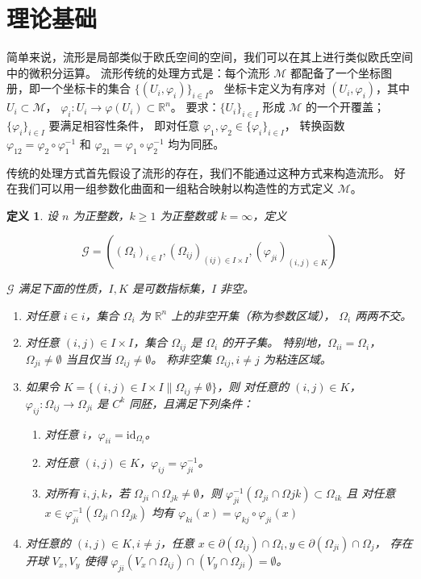 \documentclass{ctexart}
\newtheorem{Def}{定义}
\begin{document}
\section{理论基础}
	简单来说，流形是局部类似于欧氏空间的空间，我们可以在其上进行类似欧氏空间中的微积分运算。
	流形传统的处理方式是：每个流形 $\mathcal{M}$ 都配备了一个坐标图册，即一个坐标卡的集合 $\{(U_i,\varphi_i)\}_{i\in I}$。
	坐标卡定义为有序对 $(U_i,\varphi_i)$，其中
	$U_i\subset \mathcal{M}$，
	$\varphi_i:U_i\rightarrow \varphi(U_i)\subset \mathbb{R}^n$。
	要求：$\{U_i\}_{i\in I}$ 形成 $\mathcal{M}$ 的一个开覆盖；
	$\{\varphi_i\}_{i\in I}$ 要满足相容性条件，
	即对任意 $\varphi_1,\varphi_2\in \{\varphi_i\}_{i\in I}$，
	转换函数 $\varphi_{12}=\varphi_2\circ \varphi_1^{-1}$ 和 $\varphi_{21}=\varphi_1\circ \varphi_2^{-1}$ 均为同胚。

	传统的处理方式首先假设了流形的存在，我们不能通过这种方式来构造流形。
	好在我们可以用一组参数化曲面和一组粘合映射以构造性的方式定义 $\mathcal{M}$。

	\begin{Def}\label{PGM-def}
		设 $n$ 为正整数，$k\geq 1$ 为正整数或 $k=\infty$，定义

		\begin{equation}
			\mathcal{G}=((\Omega_i)_{i\in I},(\Omega_{ij})_{(ij)\in I\times I},(\varphi_{ji})_{(i,j)\in K})
		\end{equation}

		$\mathcal{G}$ 满足下面的性质，$I,K$ 是可数指标集，$I$ 非空。

		\begin{enumerate}
			\item
				对任意 $i\in i$，集合 $\Omega_i$ 为 $\mathbb{R}^n$ 上的非空开集（称为参数区域），
				$\Omega_i$ 两两不交。
			\item
				对任意 $(i,j)\in I\times I$，集合 $\Omega_{ij}$ 是 $\Omega_i$ 的开子集。
				特别地，$\Omega_{ii}=\Omega_i$，$\Omega_{ji}\neq \emptyset$ 当且仅当 $\Omega_{ij}\neq \emptyset$。
				称非空集 $\Omega_{ij},i\neq j$ 为粘连区域。
			\item
				如果令 $K=\{(i,j)\in I\times I\|\Omega_{ij}\neq \emptyset\}$，则
				对任意的 $(i,j)\in K$，$\varphi_{ij}:\Omega_{ij}\rightarrow \Omega_{ji}$ 是 $C^k$ 同胚，且满足下列条件：
				\begin{enumerate}
					\item 对任意 $i$，$\varphi_{ii}=\text{id}_{\Omega_i}$。
					\item 对任意 $(i,j)\in K$，$\varphi_{ij}=\varphi_{ji}^{-1}$。
					\item
						对所有 $i,j,k$，若 $\Omega_{ji}\cap \Omega_{jk}\neq \emptyset$，则
						$\varphi_{ji}^{-1}(\Omega_{ji}\cap \Omega{jk})\subset \Omega_{ik}$ 且
						对任意 $x\in \varphi_{ji}^{-1}(\Omega_{ji}\cap \Omega_{jk})$
						均有 $\varphi_{ki}(x)=\varphi_{kj}\circ\varphi_{ji}(x)$ 
				\end{enumerate}
			\item
				对任意的 $(i,j)\in K,i\neq j$，任意 $x\in \partial(\Omega_{ij})\cap \Omega_i,y\in \partial(\Omega_{ji})\cap \Omega_j$，
				存在开球 $V_x,V_y$ 使得 $\varphi_{ji}(V_x\cap \Omega_{ij})\cap (V_y\cap \Omega_{ji})=\emptyset$。
		\end{enumerate}
	\end{Def}
\end{document}
